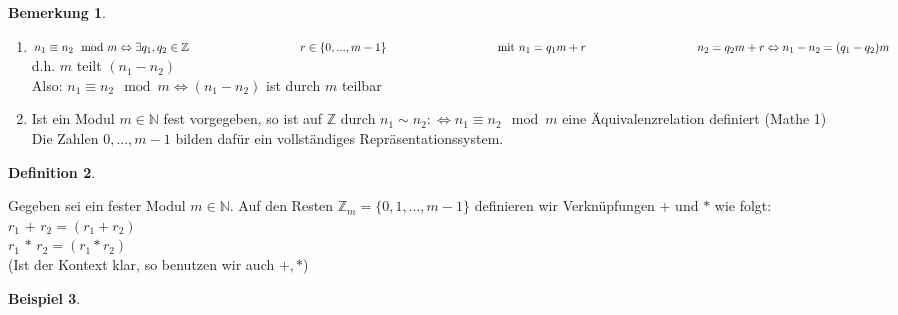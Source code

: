 \documentclass[a4paper,11pt]{article}
\newtheorem{definition}{Definition}[section]
\newtheorem{bsp}[definition]{Beispiel}
\newtheorem{bem}[definition]{Bemerkung}
\begin{document}
\begin{bem}
\end{bem}
\begin{enumerate}[label=\alph*)]
\item$n_1\equiv n_2\mod m\Leftrightarrow\exists q_1,q_2\in\mathbb{Z} \\
\null\hspace{34mm}r\in\{0,...,m-1\} \\
\null\hspace{34mm}\text{mit }n_1=q_1m+r \\
\null\hspace{34mm}n_2=q_2m+r \\
\Leftrightarrow n_1-n_2=(q_1-q_2)m$ \\
d.h. $m$ teilt $(n_1-n_2)$ \\
Also: $n_1\equiv n_2\mod m\Leftrightarrow (n_1-n_2)$ ist durch $m$ teilbar
\item Ist ein Modul $m\in\mathbb{N}$ fest vorgegeben, so ist auf $\mathbb{Z}$ durch $n_1\sim n_2\colon\Leftrightarrow n_1\equiv n_2\mod m$ eine Äquivalenzrelation definiert (Mathe 1) \\
Die Zahlen $0,...,m-1$ bilden dafür ein vollständiges Repräsentationssystem.
\end{enumerate}
\newpage
\begin{definition}
\end{definition}
Gegeben sei ein fester Modul $m\in\mathbb{N}$. Auf den Resten $\mathbb{Z}_m=\{0,1,...,m-1\}$ definieren wir Verknüpfungen \textcircled{$+$} und \textcircled{$*$} wie folgt: \\
$r_1$ \textcircled{$+$} $r_2=(r_1+r_2)$ \\
$r_1$ \textcircled{$*$} $r_2=(r_1*r_2)$ \\
(Ist der Kontext klar, so benutzen wir auch $+,*$)
\begin{bsp}
\end{bsp}
\end{document}
